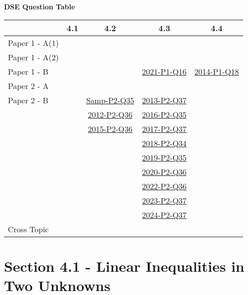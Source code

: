 \documentclass[12pt, a4paper]{article}
\begin{document}
\begin{absolutelynopagebreak}
\begin{center}
\textbf{DSE Question Table}
\end{center}
\begin{center}
\begin{tabular}{|l|c|c|c|c|}
\hline
        & 4.1 & 4.2 & 4.3 & 4.4 \\\hline
\hline
Paper 1 - A(1)&  &  &  &  \\
\hline
Paper 1 - A(2)&  &  &  &  \\
\hline
Paper 1 - B&  &  & \hyperref[DSE2021-CoreP1-Q16]{2021-P1-Q16} & \hyperref[DSE2014-CoreP1-Q18]{2014-P1-Q18} \\
\hline
\hline
Paper 2 - A&  &  &  &  \\
\hline
Paper 2 - B&  & \hyperref[DSE2012S-CoreP2-Q35]{Samp-P2-Q35} & \hyperref[DSE2013-CoreP2-Q37]{2013-P2-Q37} &  \\
&  & \hyperref[DSE2012-CoreP2-Q36]{2012-P2-Q36} & \hyperref[DSE2016-CoreP2-Q35]{2016-P2-Q35} &  \\
&  & \hyperref[DSE2015-CoreP2-Q36]{2015-P2-Q36} & \hyperref[DSE2017-CoreP2-Q37]{2017-P2-Q37} &  \\
&  &  & \hyperref[DSE2018-CoreP2-Q34]{2018-P2-Q34} &  \\
&  &  & \hyperref[DSE2019-CoreP2-Q35]{2019-P2-Q35} &  \\
&  &  & \hyperref[DSE2020-CoreP2-Q36]{2020-P2-Q36} &  \\
&  &  & \hyperref[DSE2022-CoreP2-Q36]{2022-P2-Q36} &  \\
&  &  & \hyperref[DSE2023-CoreP2-Q37]{2023-P2-Q37} &  \\
&  &  & \hyperref[DSE2024-CoreP2-Q37]{2024-P2-Q37} &  \\
\hline
\hline
Cross Topic&  &  &  &  \\
\hline
\end{tabular}
\end{center}
\end{absolutelynopagebreak}




\section*{Section 4.1 - Linear Inequalities in Two Unknowns \NF}\label{section:5-4-1}
\end{document}
